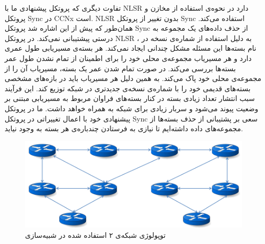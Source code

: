 تفاوت دیگری که پروتکل پیشنهادی ما با NLSR دارد در نحوه‌ی استفاده از مخازن و پروتکل Sync در CCNx است. NLSR بدون تغییر از پروتکل Sync استفاده می‌کند. همان‌طور که پیش از این اشاره شد پروتکل Sync از حذف داده‌های یک مجموعه به درستی پیشتیبانی نمی‌کند. در پروتکل NLSR ، به دلیل استفاده از شماره‌ی نسخه در نام بسته‌ها این مسئله مشکل چندانی ایجاد نمی‌کند. هر بسته‌ی مسیریابی طول عمری دارد و هر مسیریاب مجموعه‌ی محلی خود را برای اطمینان از تمام نشدن طول عمر بسته‌ها بررسی می‌کند. در صورت تمام شدن عمر یک بسته، مسیریاب آن را از مجموعه‌ی محلی خود پاک می‌کند. به همین دلیل هر مسیریاب باید در بازه‌های مشخصی بسته‌های قدیمی خود را با شماره‌ی نسخه‌ی جدیدتری در شبکه توزیع کند. این فرآیند سبب انتشار تعداد زیادی بسته در کنار بسته‌های فراوان مربوط به مسیریابی مبتنی بر وضعیت پیوند می‌شود و سربار زیادی برای شبکه به همراه خواهد داشت. ما در پروتکل پیشنهادی خود با اعمال تغییراتی در پروتکل Sync سعی بر پشتیبانی از حذف بسته‌ها از مجموعه‌های داده داشته‌ایم تا نیازی به فرستادن چندباره‌ی هر بسته به وجود نیاید.

 \begin{figure}[h!]
\centering
\includegraphics[scale=0.6]{./resources/figures/Network2.png}
\caption{توپولوژی شبکه‌ی ۲ استفاده شده در شبیه‌سازی}
\label{fig:Net2}
\end{figure}

